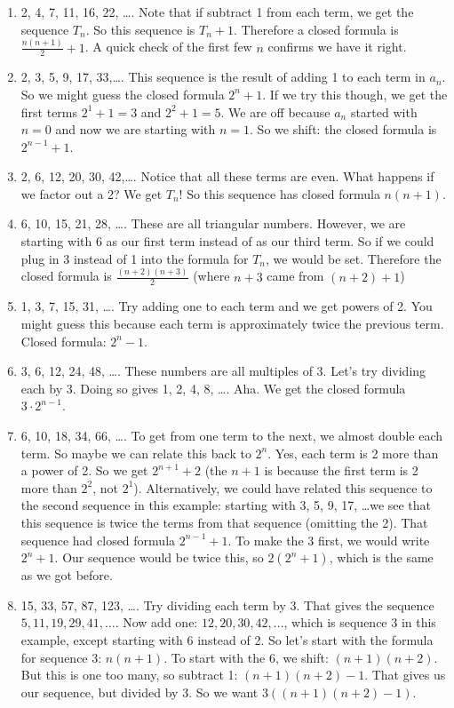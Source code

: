 \documentclass[12pt]{article}
\begin{document}
\begin{example}
\begin{solution}
    \begin{enumerate}
    \item 2, 4, 7, 11, 16, 22, \ldots. Note that if subtract 1 from each term, we get the sequence $T_n$.  So this sequence is $T_n + 1$.  Therefore a closed formula is $\frac{n(n+1)}{2} + 1$.  A quick check of the first few $n$ confirms we have it right.
    \item 2, 3, 5, 9, 17, 33,\ldots. This sequence is the result of adding 1 to each term in $a_n$.  So we might guess the closed formula $2^n + 1$.  If we try this though, we get the first terms $2^1 + 1 = 3$ and $2^2 + 1 = 5$.  We are off because $a_n$ started with $n = 0$ and now we are starting with $n = 1$.  So we shift: the closed formula is $2^{n-1} + 1$.
    \item 2, 6, 12, 20, 30, 42,\ldots. Notice that all these terms are even.  What happens if we factor out a 2?  We get $T_n$!  So this sequence has closed formula $n(n+1)$.
    \item 6, 10, 15, 21, 28, \ldots. These are all triangular numbers.  However, we are starting with 6 as our first term instead of as our third term.  So if we could plug in 3 instead of 1 into the formula for $T_n$, we would be set.  Therefore the closed formula is $\frac{(n+2)(n+3)}{2}$ (where $n+3$ came from $(n+2)+1$)
    \item 1, 3, 7, 15, 31, \ldots. Try adding one to each term and we get powers of 2.  You might guess this because each term is approximately twice the previous term.  Closed formula: $2^{n} - 1$.
    \item 3, 6, 12, 24, 48, \ldots. These numbers are all multiples of 3.  Let's try dividing each by 3.  Doing so gives 1, 2, 4, 8, \ldots.  Aha.  We get the closed formula $3\cdot 2^{n-1}$.
    \item 6, 10, 18, 34, 66, \ldots. To get from one term to the next, we almost double each term.  So maybe we can relate this back to $2^n$. Yes, each term is 2 more than a power of 2.  So we get $2^{n+1} + 2$ (the $n+1$ is because the first term is 2 more than $2^2$, not $2^1$).  Alternatively, we could have related this sequence to the second sequence in this example: starting with 3, 5, 9, 17, \ldots we see that this sequence is twice the terms from that sequence (omitting the 2).  That sequence had closed formula $2^{n-1} + 1$.  To make the 3 first, we would write $2^{n} + 1$.  Our sequence would be twice this, so $2(2^n + 1)$, which is the same as we got before.
    \item 15, 33, 57, 87, 123, \ldots. Try dividing each term by 3.  That gives the sequence $5, 11, 19, 29, 41,\ldots$.  Now add one: $12, 20, 30, 42, \ldots$, which is sequence 3 in this example, except starting with 6 instead of 2.  So let's start with the formula for sequence 3: $n(n+1)$.  To start with the 6, we shift: $(n+1)(n+2)$.  But this is one too many, so subtract 1: $(n+1)(n+2) - 1$.  That gives us our sequence, but divided by 3.  So we want $3((n+1)(n+2) - 1)$.
  \end{enumerate}
\end{solution}

\end{example}
\end{document}
